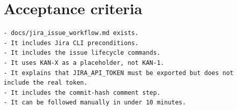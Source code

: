 \documentclass{article}
\begin{document}
\section{Acceptance criteria}


\begin{verbatim}
- docs/jira_issue_workflow.md exists.
- It includes Jira CLI preconditions.
- It includes the issue lifecycle commands.
- It uses KAN-X as a placeholder, not KAN-1.
- It explains that JIRA_API_TOKEN must be exported but does not include the real token.
- It includes the commit-hash comment step.
- It can be followed manually in under 10 minutes.


\end{verbatim}



  
\end{document}
